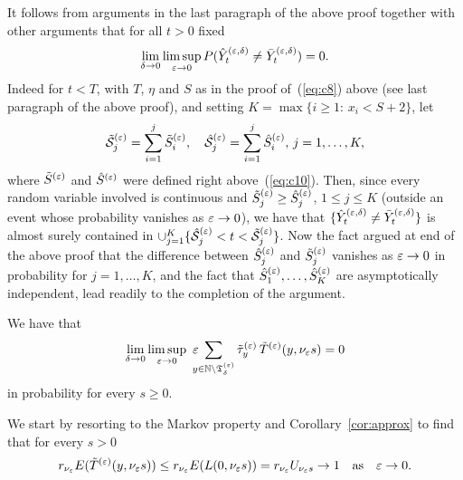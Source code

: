 \begin{rmk}
 \label{rmk:byed}
It follows from arguments in the last paragraph of the above proof together with other arguments that for all $t>0$ fixed
\begin{equation}
\label{eq:comp1a}
\lim_{\delta\to0}\limsup_{\eps\to0}P(\byed_t\ne\vyed_t)=0.
\end{equation}
Indeed for $t<T$, with $T$, $\eta$ and $S$ as in the proof of~(\ref{eq:c8}) above (see last paragraph of the above proof),
and setting $K=\max\{i\geq1:\,x_i<S+2\}$, let 
\begin{equation}
\tilde{\cal S}^{(\varepsilon)}_j=\sum_{i=1}^j\tilde S^{(\varepsilon)}_i,\quad\hat{\cal S}^{(\varepsilon)}_j=\sum_{i=1}^j\hat S^{(\varepsilon)}_i,\,j=1,\ldots,K,
\end{equation}
where $\tilde S^{(\varepsilon)}$ and $\hat S^{(\varepsilon)}$ were defined right above~(\ref{eq:c10}). Then, since every random variable involved
is continuous and $\tilde S^{(\varepsilon)}_j\geq\hat S^{(\varepsilon)}_j$, $1\leq j\leq K$ (outside an event whose probability vanishes as $\varepsilon\to0$),
we have that $\{\hat Y^{(\varepsilon,\delta)}_t\ne\bar Y^{(\varepsilon,\delta)}_t\}$ %
is almost surely contained in 
$\cup_{j=1}^K\{\hat{\cal S}^{(\varepsilon)}_{j}<t<\tilde{\cal S}^{(\varepsilon)}_{j}\}$. Now the fact argued at end of the above proof that the difference 
between $\hat S^{(\varepsilon)}_{j}$ and $\tilde S^{(\varepsilon)}_{j}$ vanishes as $\varepsilon\to0$ in probability for $j=1,\ldots,K$,
and the fact that $\hat S^{(\varepsilon)}_1,\ldots,\hat S^{(\varepsilon)}_K$ are asymptotically independent, lead readily to the completion of the argument.
\end{rmk}





\begin{lm}
\label{lm:neg}
We have that
\begin{equation}
\label{eq:c2a}
\lim_{\delta\to0}\limsup_{\eps\to0}\,\,\eps\!\!\!\!\sum_{y\in\N\setminus\teps_\delta} 
\tilde\tau_{y}^{(\eps)}\,\bte(y,\nu_\eps s)=0
\end{equation}
in probability for every $s\geq0$. 
\end{lm}




We start by resorting to the Markov property and Corollary~\ref{cor:approx} %
to find that for every $s>0$
\begin{equation}
\label{eq:expcurly}
r_{\nu_\eps}E(\bte(y,\nu_\eps s))\leq r_{\nu_\eps}E(L(0,\nu_\eps s))=
r_{\nu_\eps}U_{\nu_\eps s}\to1\quad\mbox{as}\quad\eps\to0.
\end{equation}

